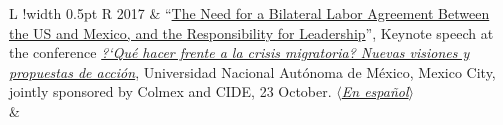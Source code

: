 \documentclass[10pt]{article}
\newcommand\VRule{\color{lightgray}\vrule width 0.5pt}
\begin{document}
\begin{longtable}{L !{\VRule}  R}
2017 & ``\href{https://www.cgdev.org/sites/default/files/need-bilateral-labor-agreement-between-us-and-mexico-english-lang.pdf}{The Need for a Bilateral Labor Agreement Between the US and Mexico, and the Responsibility for Leadership}'', Keynote speech at the conference \href{http://migdep.colmex.mx/actividades/que-hacer-frente-a-la-crisis-migratoria.html}{\it ?`Qu\'{e} hacer frente a la crisis migratoria? Nuevas visiones y propuestas de acci\'{o}n}, Universidad Nacional Aut\'{o}noma de M\'{e}xico, Mexico City, jointly sponsored by Colmex and CIDE, 23 October. $\big \langle$\href{https://www.cgdev.org/sites/default/files/need-bilateral-labor-agreement-between-us-and-mexico-spanish-lang.pdf}{\textit{En espa\~{n}ol}}$\big \rangle$ \\
&\\[-1ex]


\end{longtable}
\end{document}
